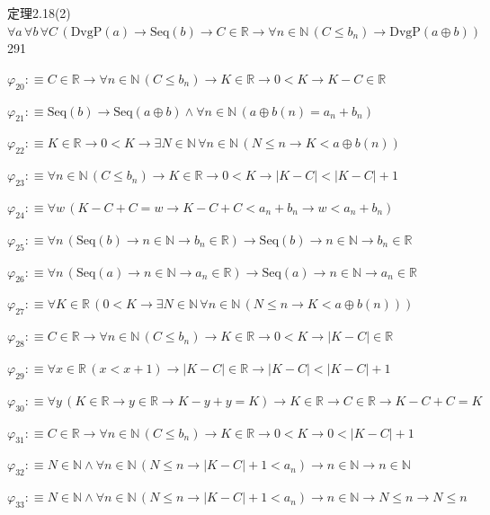 \begin{fullproof}{定理2.18(2)}{$\forall a\,\forall b\,\forall C\,(\mathrm{DvgP}(a) \to \mathrm{Seq}(b) \to C \in \mathbb{R} \to \forall n \in \mathbb{N}\,(C \leq b_{n}) \to \mathrm{DvgP}(a \oplus b))$}{291}
\begin{abbrevlist}
\item $\varphi_{20} :\equiv C \in \mathbb{R} \to \forall n \in \mathbb{N}\,(C \leq b_{n}) \to K \in \mathbb{R} \to 0 < K \to K - C \in \mathbb{R}$
\item $\varphi_{21} :\equiv \mathrm{Seq}(b) \to \mathrm{Seq}(a \oplus b) \land \forall n \in \mathbb{N}\,(a \oplus b(n) = a_{n} + b_{n})$
\item $\varphi_{22} :\equiv K \in \mathbb{R} \to 0 < K \to \exists N \in \mathbb{N}\,\forall n \in \mathbb{N}\,(N \leq n \to K < a \oplus b(n))$
\item $\varphi_{23} :\equiv \forall n \in \mathbb{N}\,(C \leq b_{n}) \to K \in \mathbb{R} \to 0 < K \to \lvert K - C \rvert < \lvert K - C \rvert + 1$
\item $\varphi_{24} :\equiv \forall w\,(K - C + C = w \to K - C + C < a_{n} + b_{n} \to w < a_{n} + b_{n})$
\item $\varphi_{25} :\equiv \forall n\,(\mathrm{Seq}(b) \to n \in \mathbb{N} \to b_{n} \in \mathbb{R}) \to \mathrm{Seq}(b) \to n \in \mathbb{N} \to b_{n} \in \mathbb{R}$
\item $\varphi_{26} :\equiv \forall n\,(\mathrm{Seq}(a) \to n \in \mathbb{N} \to a_{n} \in \mathbb{R}) \to \mathrm{Seq}(a) \to n \in \mathbb{N} \to a_{n} \in \mathbb{R}$
\item $\varphi_{27} :\equiv \forall K \in \mathbb{R}\,(0 < K \to \exists N \in \mathbb{N}\,\forall n \in \mathbb{N}\,(N \leq n \to K < a \oplus b(n)))$
\item $\varphi_{28} :\equiv C \in \mathbb{R} \to \forall n \in \mathbb{N}\,(C \leq b_{n}) \to K \in \mathbb{R} \to 0 < K \to \lvert K - C \rvert \in \mathbb{R}$
\item $\varphi_{29} :\equiv \forall x \in \mathbb{R}\,(x < x + 1) \to \lvert K - C \rvert \in \mathbb{R} \to \lvert K - C \rvert < \lvert K - C \rvert + 1$
\item $\varphi_{30} :\equiv \forall y\,(K \in \mathbb{R} \to y \in \mathbb{R} \to K - y + y = K) \to K \in \mathbb{R} \to C \in \mathbb{R} \to K - C + C = K$
\item $\varphi_{31} :\equiv C \in \mathbb{R} \to \forall n \in \mathbb{N}\,(C \leq b_{n}) \to K \in \mathbb{R} \to 0 < K \to 0 < \lvert K - C \rvert + 1$
\item $\varphi_{32} :\equiv N \in \mathbb{N} \land \forall n \in \mathbb{N}\,(N \leq n \to \lvert K - C \rvert + 1 < a_{n}) \to n \in \mathbb{N} \to n \in \mathbb{N}$
\item $\varphi_{33} :\equiv N \in \mathbb{N} \land \forall n \in \mathbb{N}\,(N \leq n \to \lvert K - C \rvert + 1 < a_{n}) \to n \in \mathbb{N} \to N \leq n \to N \leq n$

\end{abbrevlist}
\end{fullproof}
